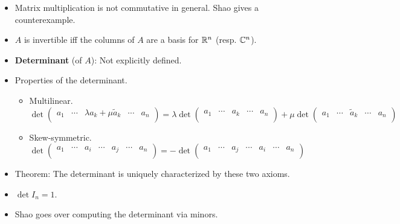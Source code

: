 \documentclass[../notes.tex]{subfiles}
\begin{document}
\begin{itemize}
\begin{equation*}
    \end{equation*}
    \item Matrix multiplication is not commutative in general. Shao gives a counterexample.
    \item $A$ is invertible iff the columns of $A$ are a basis for $\mathbb{R}^n$ (resp. $\mathbb{C}^n$).
    \item \textbf{Determinant} (of $A$): Not explicitly defined.
    \item Properties of the determinant.
    \begin{itemize}
        \item Multilinear.
        \begin{equation*}
            \det
            \begin{pmatrix}
                a_1 & \cdots & \lambda a_k+\mu\tilde{a}_k & \cdots & a_n\\
            \end{pmatrix}
            = \lambda\det
            \begin{pmatrix}
                a_1 & \cdots & a_k & \cdots & a_n\\
            \end{pmatrix}
            +\mu\det
            \begin{pmatrix}
                a_1 & \cdots & \tilde{a}_k & \cdots & a_n\\
            \end{pmatrix}
        \end{equation*}
        \item Skew-symmetric.
        \begin{equation*}
            \det
            \begin{pmatrix}
                a_1 & \cdots & a_i & \cdots & a_j & \cdots & a_n\\
            \end{pmatrix}
            = -\det
            \begin{pmatrix}
                a_1 & \cdots & a_j & \cdots & a_i & \cdots & a_n\\
            \end{pmatrix}
        \end{equation*}
    \end{itemize}
    \item Theorem: The determinant is uniquely characterized by these two axioms.
    \item $\det I_n=1$.
    \item Shao goes over computing the determinant via minors.

\end{itemize}
\end{document}
